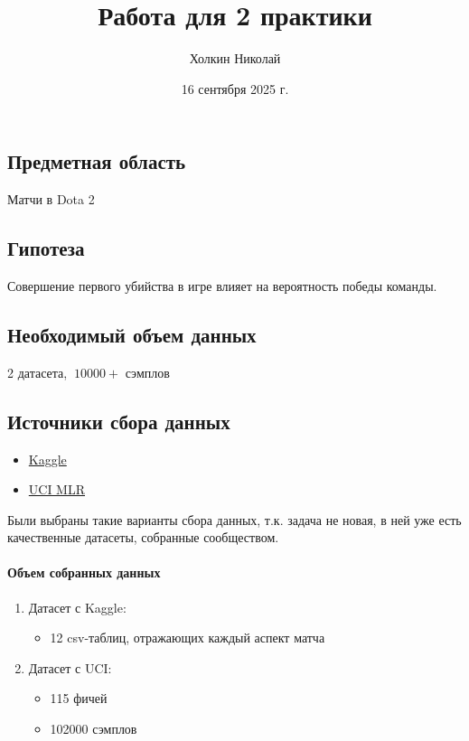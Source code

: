 


	\title{Работа для 2 практики}
	\author{Холкин Николай}
	\date{16 сентября 2025 г.}
	
	\maketitle
	
		
		
		\subsection{Предметная область}
		Матчи в Dota 2
		
	\subsection{Гипотеза}
		Совершение первого убийства в игре влияет на вероятность победы команды.
		
	\subsection{Необходимый объем данных}
		2 датасета, $~10000+$ сэмплов
		
	\subsection{Источники сбора данных}
		\begin{itemize}
			\item \href{https://www.kaggle.com/datasets/bwandowando/dota-2-pro-league-matches-2023}{Kaggle}
			\item \href{https://archive.ics.uci.edu/dataset/367/dota2+games+results}{UCI MLR}
		\end{itemize}
		
	Были выбраны такие варианты сбора данных, т.к. задача не новая, в ней уже есть качественные датасеты, собранные сообществом.
	
	\paragraph{Объем собранных данных}
		\begin{enumerate}
			\item Датасет с Kaggle:
			\begin{itemize}
				\item 12 csv-таблиц, отражающих каждый аспект матча
			\end{itemize}
			
			\item Датасет с UCI:
			\begin{itemize}
				\item 115 фичей
				\item 102000 сэмплов
			\end{itemize}
		\end{enumerate}
		
